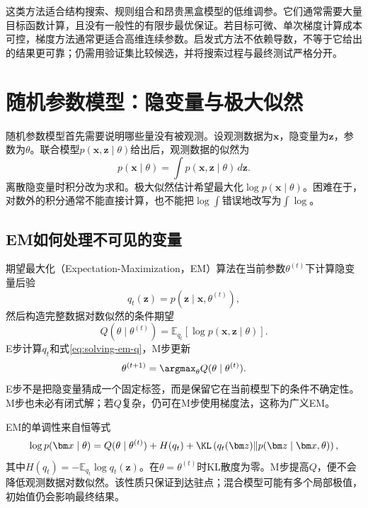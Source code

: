 这类方法适合结构搜索、规则组合和昂贵黑盒模型的低维调参。它们通常需要大量目标函数计算，且没有一般性的有限步最优保证。若目标可微、单次梯度计算成本可控，梯度方法通常更适合高维连续参数。启发式方法不依赖导数，不等于它给出的结果更可靠；仍需用验证集比较候选，并将搜索过程与最终测试严格分开。

\section{随机参数模型：隐变量与极大似然}

随机参数模型首先需要说明哪些量没有被观测。设观测数据为$\bm x$，隐变量为$\bm z$，参数为$\theta$。联合模型$p(\bm x,\bm z\mid\theta)$给出后，观测数据的似然为
\begin{equation}
 p(\bm x\mid\theta)=\int p(\bm x,\bm z\mid\theta)\,d\bm z.
 \label{eq:solving-marginal-likelihood}
\end{equation}
离散隐变量时积分改为求和。极大似然估计希望最大化$\log p(\bm x\mid\theta)$。困难在于，对数外的积分通常不能直接计算，也不能把$\log\int$错误地改写为$\int\log$。

\subsection{EM如何处理不可见的变量}
期望最大化（Expectation-Maximization，EM）算法在当前参数$\theta^{(t)}$下计算隐变量后验
\begin{equation}
 q_t(\bm z)=p(\bm z\mid\bm x,\theta^{(t)}),
\end{equation}
然后构造完整数据对数似然的条件期望
\begin{equation}
 Q(\theta\mid\theta^{(t)})=
 \mathbb E_{q_t}[\log p(\bm x,\bm z\mid\theta)].
 \label{eq:solving-em-q}
\end{equation}
E步计算$q_t$和式\eqref{eq:solving-em-q}，M步更新
\begin{equation}
 \theta^{(t+1)}=\argmax_\theta Q(\theta\mid\theta^{(t)}).
 \label{eq:solving-em-m}
\end{equation}
E步不是把隐变量猜成一个固定标签，而是保留它在当前模型下的条件不确定性。M步也未必有闭式解；若$Q$复杂，仍可在M步使用梯度法，这称为广义EM。

EM的单调性来自恒等式
\begin{equation}
 \log p(\bm x\mid\theta)=Q(\theta\mid\theta^{(t)})+
 H(q_t)+\KL\left(q_t(\bm z)\|p(\bm z\mid\bm x,\theta)\right),
 \label{eq:solving-em-decomposition}
\end{equation}
其中$H(q_t)=-\mathbb E_{q_t}\log q_t(\bm z)$。在$\theta=\theta^{(t)}$时KL散度为零。M步提高$Q$，便不会降低观测数据对数似然。该性质只保证到达驻点；混合模型可能有多个局部极值，初始值仍会影响最终结果。

